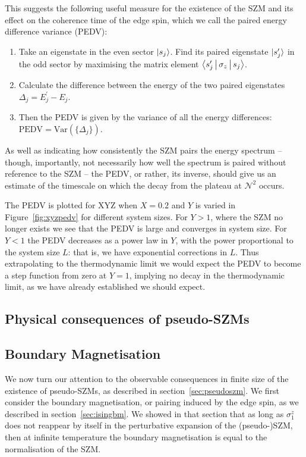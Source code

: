 \documentclass [a4paper, 11pt]{article}
\begin{document}
This suggests the following useful measure for the existence of the SZM and its effect on the coherence time of the edge spin, which we call the paired energy difference variance (PEDV): 
\begin{enumerate}
\item Take an eigenstate in the even sector $\ket{s_j}$. Find its paired eigenstate $\ket{s_j^\prime}$ in the odd sector by maximising the matrix element $\Braket{s_j^\prime|\sigma_z|s_j}$.
\item Calculate the difference between the energy of the two paired eigenstates $\Delta_j = E_j^\prime -E_j$.
\item Then the PEDV is given by the variance of all the energy differences: $\text{PEDV} = \text{Var}(\{\Delta_j\})$. 
\end{enumerate}
As well as indicating how consistently the SZM pairs the energy spectrum -- though, importantly, not necessarily how well the spectrum is paired without reference to the SZM -- the PEDV, or rather, its inverse, should give us an estimate of the timescale on which the decay from the plateau at $\mathcal{N}^2$ occurs.

The PEDV is plotted for XYZ when $X = 0.2$ and $Y$ is varied in Figure~\ref{fig:xyzpedv} for different system sizes. For $Y>1$, where the SZM no longer exists we see that the PEDV is large and converges in system size. For $Y<1$ the PEDV decreases as a power law in $Y$, with the power proportional to the system size $L$: that is, we have exponential corrections in $L$. Thus extrapolating to the thermodynamic limit we would expect the PEDV to become a step function from zero at $Y=1$, implying no decay in the thermodynamic limit, as we have already established we should expect.




\subsection{Physical consequences of pseudo-SZMs}
\subsection{Boundary Magnetisation}
We now turn our attention to the observable consequences in finite size of the existence of pseudo-SZMs, as described in section~\ref{sec:pseudoszm}. We first consider the boundary magnetisation, or pairing induced by the edge spin, as we described in section~\ref{sec:isingbm}. We showed in that section that as long as $\sigma^z_1$ does not reappear by itself in the perturbative expansion of the (pseudo-)SZM, then at infinite temperature the boundary magnetisation is equal to the normalisation of the SZM.
\end{document}
